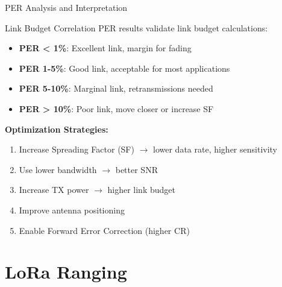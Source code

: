 \documentclass{beamer}
\begin{document}
\begin{frame}{PER Analysis and Interpretation}
\begin{block}{Link Budget Correlation}
PER results validate link budget calculations:
\begin{itemize}
    \item \textbf{PER < 1\%}: Excellent link, margin for fading
    \item \textbf{PER 1-5\%}: Good link, acceptable for most applications
    \item \textbf{PER 5-10\%}: Marginal link, retransmissions needed
    \item \textbf{PER > 10\%}: Poor link, move closer or increase SF
\end{itemize}
\end{block}

\vspace{0.3cm}

\textbf{Optimization Strategies:}
\begin{enumerate}
    \item Increase Spreading Factor (SF) $\rightarrow$ lower data rate, higher sensitivity
    \item Use lower bandwidth $\rightarrow$ better SNR
    \item Increase TX power $\rightarrow$ higher link budget
    \item Improve antenna positioning
    \item Enable Forward Error Correction (higher CR)
\end{enumerate}
\end{frame}

\section{LoRa Ranging}
\end{document}
